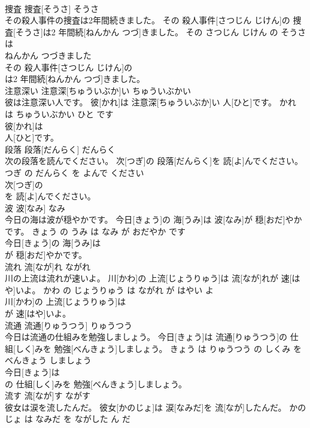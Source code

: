 \documentclass[8pt]{extreport}
\begin{document}
\begin{CJK}{UTF8}{min}
\\	捜査	捜査[そうさ]	そうさ	
\\	その殺人事件の捜査は2年間続きました。	その 殺人事件[さつじん じけん]の 捜査[そうさ]は2 年間続[ねんかん つづ]きました。	その さつじん じけん の そうさ は 
\\	ねんかん つづきました	
\\	その 殺人事件[さつじん じけん]の
\\	は2 年間続[ねんかん つづ]きました。			
\\	注意深い	注意深[ちゅういぶか]い	ちゅういぶかい	
\\	彼は注意深い人です。	彼[かれ]は 注意深[ちゅういぶか]い 人[ひと]です。	かれ は ちゅういぶかい ひと です	
\\	彼[かれ]は
\\	人[ひと]です。			
\\	段落	段落[だんらく]	だんらく	
\\	次の段落を読んでください。	次[つぎ]の 段落[だんらく]を 読[よ]んでください。	つぎ の だんらく を よんで ください	
\\	次[つぎ]の
\\	を 読[よ]んでください。			
\\	波	波[なみ]	なみ	
\\	今日の海は波が穏やかです。	今日[きょう]の 海[うみ]は 波[なみ]が 穏[おだ]やかです。	きょう の うみ は なみ が おだやか です	
\\	今日[きょう]の 海[うみ]は
\\	が 穏[おだ]やかです。			
\\	流れ	流[なが]れ	ながれ	
\\	川の上流は流れが速いよ。	川[かわ]の 上流[じょうりゅう]は 流[なが]れが 速[はや]いよ。	かわ の じょうりゅう は ながれ が はやい よ	
\\	川[かわ]の 上流[じょうりゅう]は
\\	が 速[はや]いよ。			
\\	流通	流通[りゅうつう]	りゅうつう	
\\	今日は流通の仕組みを勉強しましょう。	今日[きょう]は 流通[りゅうつう]の 仕組[しく]みを 勉強[べんきょう]しましょう。	きょう は りゅうつう の しくみ を べんきょう しましょう	
\\	今日[きょう]は
\\	の 仕組[しく]みを 勉強[べんきょう]しましょう。			
\\	流す	流[なが]す	ながす	
\\	彼女は涙を流したんだ。	彼女[かのじょ]は 涙[なみだ]を 流[なが]したんだ。	かのじょ は なみだ を ながした ん だ	

\end{CJK}
\end{document}
